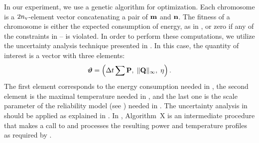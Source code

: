In our experiment, we use a genetic algorithm for optimization.
Each chromosome is a $2 {n_\text{v}}$-element vector concatenating a pair of $\mathbf{m}$ and $\mathbf{n}$.
The fitness of a chromosome is either the expected consumption of energy, as in , or zero if any of the constraints in -- is violated.
In order to perform these computations, we utilize the uncertainty analysis technique presented in .
In this case, the quantity of interest is a vector with three elements:
\begin{equation} \elab{quantity-of-interest}
  \vw = \left( \dt \sum \mP, \; \norm[\infty]{\mQ}, \; \eta \right).
\end{equation}
The first element corresponds to the energy consumption needed in , the second element is the maximal temperature needed in , and the last one is the scale parameter of the reliability model (see ) needed in .
The uncertainty analysis in  should be applied as explained in .
In , Algorithm~X is an intermediate procedure that makes a call to  and processes the resulting power and temperature profiles as required by .
